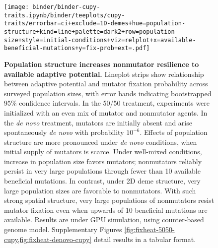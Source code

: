 \begin{figure}[h]
\begin{minipage}{\textwidth}
  \texttt{[image: binder/binder-cupy-traits.ipynb/binder/teeplots/cupy-traits/errorbar=ci+exclude=1D-demes+hue=population-structure+kind=line+palette=dark2+row=population-size+style=initial-conditions+viz=relplot+x=available-beneficial-mutations+y=fix-prob+ext=.pdf]}%
\end{minipage}

\begin{minipage}{\textwidth}
  \caption{%
    \textbf{Population structure increases nonmutator resilience to available adaptive potential.}
    \footnotesize
    Lineplot strips show relationship between adaptive potential and mutator fixation probability across surveyed population sizes, with error bands indicating bootstrapped 95\% confidence intervals.
    In the 50/50 treatment, experiments were initialized with an even mix of mutator and nonmutator agents.
    In the \textit{de novo} treatment, mutators are initially absent and arise spontaneously \textit{de novo} with probability $10^{-6}$.
    Effects of population structure are more pronounced under \textit{de novo} conditions, when initial supply of mutators is scarce.
    Under well-mixed conditions, increase in population size favors mutators; nonmutators reliably persist in very large populations through fewer than 10 available beneficial mutations.
    In contrast, under 2D deme structure, very large population sizes are favorable to nonmutators.
    With such strong spatial structure, very large populations of nonmutators resist mutator fixation even when upwards of 10 beneficial mutations are available.
    Results are under GPU simulation, using counter-based genome model.
    Supplementary Figures \cref{fig:fixheat-5050-cupy,fig:fixheat-denovo-cupy} detail results in a tabular format.
  }
  \label{fig:spatial-structure-combined}
\end{minipage}
\end{figure}
